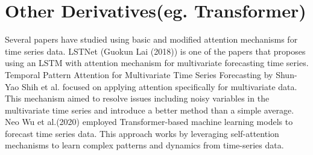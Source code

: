 \section{Other Derivatives(eg. Transformer)}

Several papers have studied using basic and modified attention mechanisms for time series data. LSTNet (Guokun Lai (2018)) is one of the papers that proposes using an LSTM with attention mechanism for multivariate forecasting time series. Temporal Pattern Attention for Multivariate Time Series Forecasting by Shun-Yao Shih et al. focused on applying attention specifically for multivariate data. This mechanism aimed to resolve issues including noisy variables in the multivariate time series and introduce a better method than a simple average. Neo Wu et al.(2020) employed Transformer-based machine learning models to forecast time series data. This approach works by leveraging self-attention mechanisms to learn complex patterns and dynamics from time-series data.
